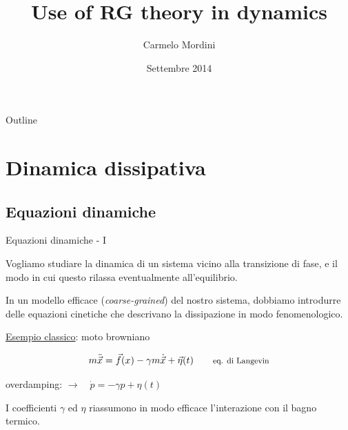 \documentclass[10pt]{beamer}
\title{Use of RG theory in dynamics}
\author[Carmelo Mordini]{Carmelo Mordini}
\date{\small{Settembre 2014}}
\begin{document}

\begin{frame}[plain]
\advance\textwidth2cm
\hsize\textwidth
\columnwidth\textwidth
  \titlepage
\end{frame}


\begin{frame}{Outline}
\transwipe[direction=270]
  \tableofcontents%
\end{frame}

\section{Dinamica dissipativa}
\subsection{Equazioni dinamiche}

\begin{frame}{Equazioni dinamiche - I}

Vogliamo studiare la dinamica di un sistema vicino alla transizione di fase, e il modo in cui questo rilassa eventualmente all'equilibrio.

In un modello efficace (\emph{coarse-grained}) del nostro sistema, dobbiamo introdurre delle equazioni cinetiche che descrivano la dissipazione in modo fenomenologico.
\pause
\vskip10pt

\underline{Esempio classico}: moto browniano

\begin{equation*}
 m\ddot{\vec x} = \vec f(x) - \gamma m \dot{\vec x} + \vec \eta(t) \qquad \text{\footnotesize eq. di Langevin}
\end{equation*}

\vskip10pt
overdamping: $\rightarrow \quad \dot p  = -\gamma p + \eta(t)$

I coefficienti $\gamma$ ed $\eta$ riassumono in modo efficace l'interazione con il bagno termico.
\end{frame}
\end{document}
